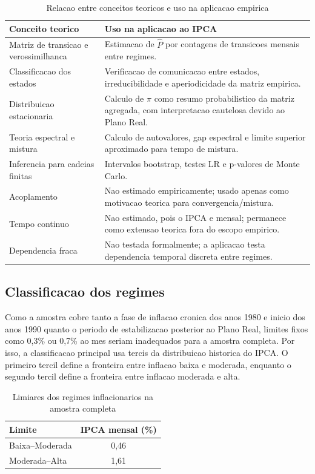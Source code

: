 \begin{table}[H]
\centering
\caption{Relacao entre conceitos teoricos e uso na aplicacao empirica}
\label{tab:ponte_teoria_aplicacao}
\begin{tabular}{p{}p{}}
\hline
Conceito teorico & Uso na aplicacao ao IPCA \\
\hline
Matriz de transicao e verossimilhanca & Estimacao de \(\widehat{P}\) por contagens de transicoes mensais entre regimes. \\
Classificacao dos estados & Verificacao de comunicacao entre estados, irreducibilidade e aperiodicidade da matriz empirica. \\
Distribuicao estacionaria & Calculo de \(\pi\) como resumo probabilistico da matriz agregada, com interpretacao cautelosa devido ao Plano Real. \\
Teoria espectral e mistura & Calculo de autovalores, gap espectral e limite superior aproximado para tempo de mistura. \\
Inferencia para cadeias finitas & Intervalos bootstrap, testes LR e p-valores de Monte Carlo. \\
Acoplamento & Nao estimado empiricamente; usado apenas como motivacao teorica para convergencia/mistura. \\
Tempo continuo & Nao estimado, pois o IPCA e mensal; permanece como extensao teorica fora do escopo empirico. \\
Dependencia fraca & Nao testada formalmente; a aplicacao testa dependencia temporal discreta entre regimes. \\
\hline
\end{tabular}
\end{table}

\subsection{Classificacao dos regimes}

Como a amostra cobre tanto a fase de inflacao cronica dos anos 1980 e inicio dos anos 1990 quanto o periodo de estabilizacao posterior ao Plano Real, limites fixos como 0,3\% ou 0,7\% ao mes seriam inadequados para a amostra completa. Por isso, a classificacao principal usa tercis da distribuicao historica do IPCA. O primeiro tercil define a fronteira entre inflacao baixa e moderada, enquanto o segundo tercil define a fronteira entre inflacao moderada e alta.

\begin{table}[H]
\centering
\caption{Limiares dos regimes inflacionarios na amostra completa}
\label{tab:limiares_globais}
\begin{tabular}{lc}
\hline
Limite & IPCA mensal (\%) \\
\hline
Baixa--Moderada & 0,46 \\
Moderada--Alta & 1,61 \\
\hline
\end{tabular}
\end{table}

